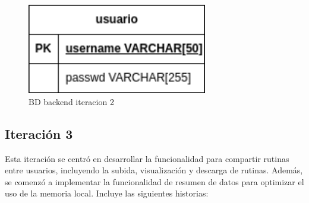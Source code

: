 \begin{figure}[H]
   \centering
    \includegraphics[width=0.7\textwidth]{fotos/BD be iteracion 2.png}
    \caption{BD backend iteracion 2}
    \label{fig:BD backend iteracion 2}
\end{figure}

\subsection{Iteraci\'on 3}
Esta iteraci\'on se centr\'o en desarrollar la funcionalidad para compartir rutinas entre usuarios, incluyendo la subida, visualizaci\'on y descarga de rutinas. Adem\'as, se comenz\'o a implementar la funcionalidad de resumen de datos para optimizar el uso de la memoria local. Incluye las siguientes historias:

